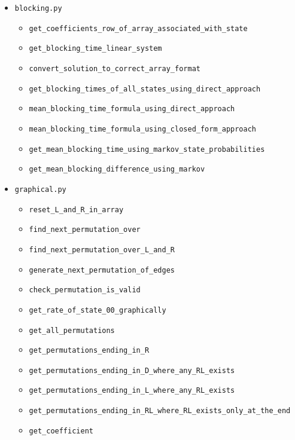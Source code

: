 \scriptsize
\begin{itemize}
    \item \texttt{blocking.py}
    \begin{itemize}
        \item \texttt{get\_coefficients\_row\_of\_array\_associated\_with\_state}
        \item \texttt{get\_blocking\_time\_linear\_system}
        \item \texttt{convert\_solution\_to\_correct\_array\_format}
        \item \texttt{get\_blocking\_times\_of\_all\_states\_using\_direct\_approach}
        \item \texttt{mean\_blocking\_time\_formula\_using\_direct\_approach}
        \item \texttt{mean\_blocking\_time\_formula\_using\_closed\_form\_approach}
        \item \texttt{get\_mean\_blocking\_time\_using\_markov\_state\_probabilities}
        \item \texttt{get\_mean\_blocking\_difference\_using\_markov}
    \end{itemize}
    \item \texttt{graphical.py}
    \begin{itemize}
        \item \texttt{reset\_L\_and\_R\_in\_array}
        \item \texttt{find\_next\_permutation\_over}
        \item \texttt{find\_next\_permutation\_over\_L\_and\_R}
        \item \texttt{generate\_next\_permutation\_of\_edges}
        \item \texttt{check\_permutation\_is\_valid}
        \item \texttt{get\_rate\_of\_state\_00\_graphically}
        \item \texttt{get\_all\_permutations}
        \item \texttt{get\_permutations\_ending\_in\_R}
        \item \texttt{get\_permutations\_ending\_in\_D\_where\_any\_RL\_exists}
        \item \texttt{get\_permutations\_ending\_in\_L\_where\_any\_RL\_exists}
        \item \texttt{get\_permutations\_ending\_in\_RL\_where\_RL\_exists\_only\_at\_the\_end}
        \item \texttt{get\_coefficient}
    \end{itemize}

\end{itemize}
